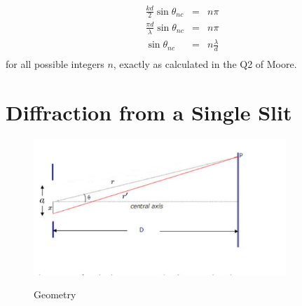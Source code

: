 \documentclass[12pt]{article}
\begin{document}
\begin{eqnarray*}
\frac{kd}{2} \sin \theta_{nc}  &=& n \pi \\
\frac{\pi d}{\lambda} \sin\theta_{nc}  &=& n \pi \\
\sin\theta_{nc} &=& n \frac{\lambda}{d} \\
\end{eqnarray*}
for all possible integers $n$, exactly as calculated in the Q2 of Moore.
 
\section{Diffraction from a Single Slit}

\begin{figure}[thb]
\begin{center}
{\includegraphics[width=0.85\textwidth]{figs/slitgeo.pdf}}
\end{center}
\caption{\label{fig:slitgeo} Geometry}
\end{figure}
\end{document}
